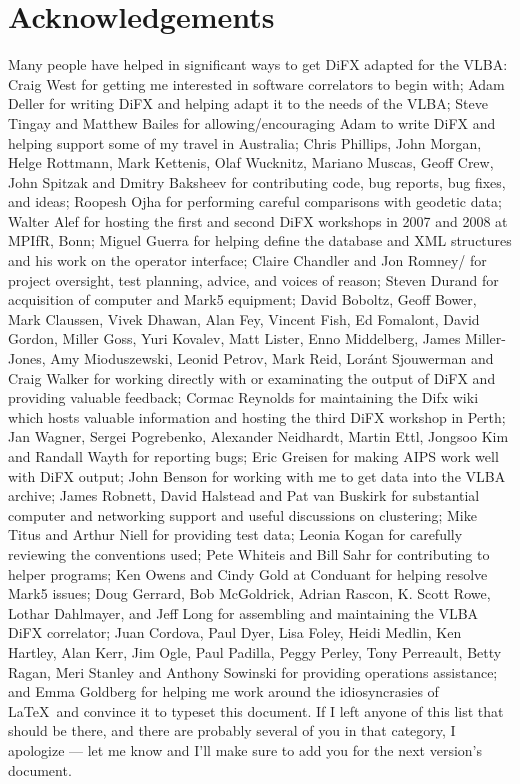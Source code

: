 \section{Acknowledgements}

Many people have helped in significant ways to get DiFX adapted for the VLBA:
Craig West for getting me interested in software correlators to begin with; 
Adam Deller for writing DiFX and helping adapt it to the needs of the VLBA; 
Steve Tingay and Matthew Bailes for allowing/encouraging Adam to write DiFX and helping support some of my travel in Australia;
Chris Phillips, John Morgan, Helge Rottmann, Mark Kettenis, Olaf Wucknitz, Mariano Muscas, Geoff Crew, John Spitzak and Dmitry Baksheev for contributing code, bug reports, bug fixes, and ideas;
Roopesh Ojha for performing careful comparisons with geodetic data;
Walter Alef for hosting the first and second DiFX workshops in 2007 and 2008 at MPIfR, Bonn;
Miguel Guerra for helping define the database and XML structures and his work on the operator interface;
Claire Chandler and Jon Romney/ for project oversight, test planning, advice, and voices of reason;
Steven Durand for acquisition of computer and Mark5 equipment;
David Boboltz, Geoff Bower, Mark Claussen, Vivek Dhawan, Alan Fey, Vincent Fish, Ed Fomalont, David Gordon, Miller Goss, Yuri Kovalev, Matt Lister, Enno Middelberg, James Miller-Jones, Amy Mioduszewski, Leonid Petrov, Mark Reid, Lor\'{a}nt Sjouwerman and Craig Walker for working directly with or examinating the output of DiFX and providing valuable feedback;
Cormac Reynolds for maintaining the Difx wiki which hosts valuable information and hosting the third DiFX workshop in Perth;
Jan Wagner, Sergei Pogrebenko, Alexander Neidhardt, Martin Ettl, Jongsoo Kim and Randall Wayth for reporting bugs;
Eric Greisen for making AIPS work well with DiFX output;
John Benson for working with me to get data into the VLBA archive;
James Robnett, David Halstead and Pat van Buskirk for substantial computer and networking support and useful discussions on clustering;
Mike Titus and Arthur Niell for providing test data;
Leonia Kogan for carefully reviewing the conventions used;
Pete Whiteis and Bill Sahr for contributing to helper programs;
Ken Owens and Cindy Gold at Conduant for helping resolve Mark5 issues;
Doug Gerrard, Bob McGoldrick, Adrian Rascon, K. Scott Rowe, Lothar Dahlmayer, and Jeff Long for assembling and maintaining the VLBA DiFX correlator;
Juan Cordova, Paul Dyer, Lisa Foley, Heidi Medlin, Ken Hartley, Alan Kerr, Jim Ogle, Paul Padilla, Peggy Perley, Tony Perreault, Betty Ragan, Meri Stanley and Anthony Sowinski for providing operations assistance;
and
Emma Goldberg for helping me work around the idiosyncrasies of \LaTeX \ and convince it to typeset this document.
If I left anyone of this list that should be there, and there are probably several of you in that category, I apologize --- let me know and I'll make sure to add you for the next version's document.


